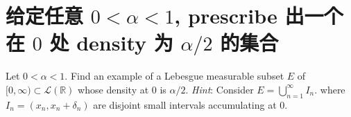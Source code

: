 \documentclass{qlnotes-export}
\begin{document}
\section{\texorpdfstring{给定任意 \(0 < \alpha < 1\), prescribe 出一个在 \(0\) 处 density 为 \(\alpha/2\) 的集合}{给定任意 0 \textless{} \textbackslash alpha \textless{} 1, prescribe 出一个在 0 处 density 为 \textbackslash alpha/2 的集合}}\label{ux7ed9ux5b9aux4efbux610f-0alpha-1-prescribe-ux51faux4e00ux4e2aux5728-0-ux5904-density-ux4e3a-alpha2-ux7684ux96c6ux5408}

Let \(0 < \alpha < 1\). Find an example of a Lebesgue measurable subset \(E\) of \(\lbrack 0,\infty) \subset \mathcal{L}({\mathbb{R}})\) whose density at \(0\) is \(\alpha/2\). \emph{Hint}: Consider \(E = \bigcup_{n = 1}^{\infty}I_{n}\). where \(I_{n} = (x_{n},x_{n} + \delta_{n})\) are disjoint small intervals accumulating at \(0\).
\end{document}

